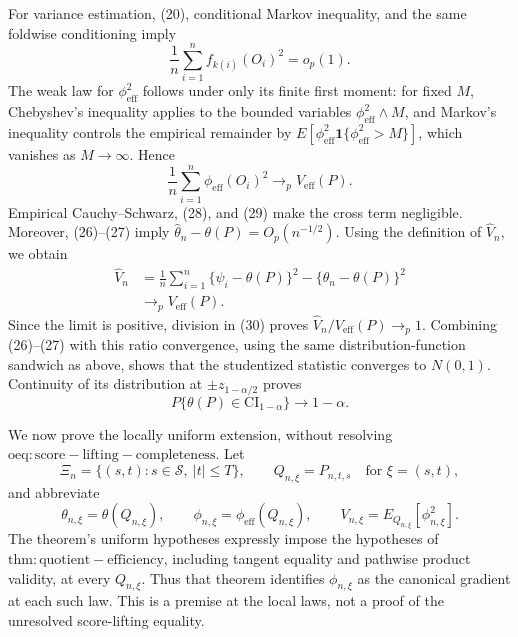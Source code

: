 For variance estimation, (20), conditional Markov inequality, and the same foldwise conditioning imply
\[
 \frac1n\sum_{i=1}^nf_{k(i)}(O_i)^2=o_p(1).                                \tag{28}
\]
The weak law for \(\phi_{\mathrm{eff}}^2\) follows under only its finite first moment: for fixed \(M\), Chebyshev's inequality applies to the bounded variables \(\phi_{\mathrm{eff}}^2\wedge M\), and Markov's inequality controls the empirical remainder by
\(E[\phi_{\mathrm{eff}}^2\mathbf 1\{\phi_{\mathrm{eff}}^2>M\}]\), which vanishes as \(M\to\infty\).  Hence
\[
 \frac1n\sum_{i=1}^n\phi_{\mathrm{eff}}(O_i)^2
 \longrightarrow_pV_{\mathrm{eff}}(P).                                   \tag{29}
\]
Empirical Cauchy--Schwarz, (28), and (29) make the cross term negligible.  Moreover, (26)--(27) imply \(\widehat\theta_n-\theta(P)=O_p(n^{-1/2})\).  Using the definition of \(\widehat V_n\), we obtain
\[
\begin{aligned}
 \widehat V_n
 &=\frac1n\sum_{i=1}^n\{\widehat\psi_i-\theta(P)\}^2
   -\{\widehat\theta_n-\theta(P)\}^2\\
 &\longrightarrow_pV_{\mathrm{eff}}(P).                                   \tag{30}
\end{aligned}
\]
Since the limit is positive, division in (30) proves
\(\widehat V_n/V_{\mathrm{eff}}(P)\to_p1\).  Combining (26)--(27) with this ratio convergence, using the same distribution-function sandwich as above, shows that the studentized statistic converges to \(N(0,1)\).  Continuity of its distribution at \(\pm z_{1-\alpha/2}\) proves
\[
 P\{\theta(P)\in\mathrm{CI}_{1-\alpha}\}\longrightarrow1-\alpha.
\]

We now prove the locally uniform extension, without resolving \(\mathrm{oeq:score-lifting-completeness}\).  Let
\[
 \Xi_n=\{(s,t):s\in\mathcal S,\ |t|\le T\},\qquad
 Q_{n,\xi}=P_{n,t,s}\quad\text{for }\xi=(s,t),
\]
and abbreviate
\[
 \theta_{n,\xi}=\theta(Q_{n,\xi}),\qquad
 \phi_{n,\xi}=\phi_{\mathrm{eff}}(Q_{n,\xi}),\qquad
 V_{n,\xi}=E_{Q_{n,\xi}}[\phi_{n,\xi}^2].
\]
The theorem's uniform hypotheses expressly impose the hypotheses of \(\mathrm{thm:quotient-efficiency}\), including tangent equality and pathwise product validity, at every \(Q_{n,\xi}\).  Thus that theorem identifies \(\phi_{n,\xi}\) as the canonical gradient at each such law.  This is a premise at the local laws, not a proof of the unresolved score-lifting equality.

